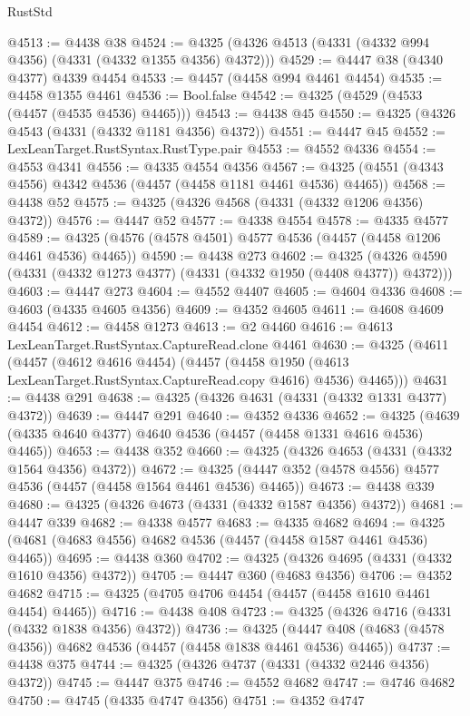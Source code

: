 \begin{lexlean}{RustStd}
\begin{coremodule}
{\begin{coremodule}
{{{{{{{{{{{{{{{{{{{{{{{{{{{{{{{{{{{{{{{{{{{{{{{{{{{{{{{{{{{{{{{{{{{{{{{{{{{{{{{{@4513 := @4438 @38
@4524 := @4325 (@4326 @4513 (@4331 (@4332 @994 @4356) (@4331 (@4332 @1355 @4356) @4372)))
@4529 := @4447 @38 (@4340 @4377) @4339 @4454
@4533 := @4457 (@4458 @994 @4461 @4454)
@4535 := @4458 @1355 @4461
@4536 := Bool.false
@4542 := @4325 (@4529 (@4533 (@4457 (@4535 @4536) @4465)))
@4543 := @4438 @45
@4550 := @4325 (@4326 @4543 (@4331 (@4332 @1181 @4356) @4372))
@4551 := @4447 @45
@4552 := LexLeanTarget.RustSyntax.RustType.pair
@4553 := @4552 @4336
@4554 := @4553 @4341
@4556 := @4335 @4554 @4356
@4567 := @4325 (@4551 (@4343 @4556) @4342 @4536 (@4457 (@4458 @1181 @4461 @4536) @4465))
@4568 := @4438 @52
@4575 := @4325 (@4326 @4568 (@4331 (@4332 @1206 @4356) @4372))
@4576 := @4447 @52
@4577 := @4338 @4554
@4578 := @4335 @4577
@4589 := @4325 (@4576 (@4578 @4501) @4577 @4536 (@4457 (@4458 @1206 @4461 @4536) @4465))
@4590 := @4438 @273
@4602 := @4325 (@4326 @4590 (@4331 (@4332 @1273 @4377) (@4331 (@4332 @1950 (@4408 @4377)) @4372)))
@4603 := @4447 @273
@4604 := @4552 @4407
@4605 := @4604 @4336
@4608 := @4603 (@4335 @4605 @4356)
@4609 := @4352 @4605
@4611 := @4608 @4609 @4454
@4612 := @4458 @1273
@4613 := @2 @4460
@4616 := @4613 LexLeanTarget.RustSyntax.CaptureRead.clone @4461
@4630 := @4325
    (@4611
      (@4457
        (@4612 @4616 @4454)
        (@4457 (@4458 @1950 (@4613 LexLeanTarget.RustSyntax.CaptureRead.copy @4616) @4536) @4465)))
@4631 := @4438 @291
@4638 := @4325 (@4326 @4631 (@4331 (@4332 @1331 @4377) @4372))
@4639 := @4447 @291
@4640 := @4352 @4336
@4652 := @4325 (@4639 (@4335 @4640 @4377) @4640 @4536 (@4457 (@4458 @1331 @4616 @4536) @4465))
@4653 := @4438 @352
@4660 := @4325 (@4326 @4653 (@4331 (@4332 @1564 @4356) @4372))
@4672 := @4325 (@4447 @352 (@4578 @4556) @4577 @4536 (@4457 (@4458 @1564 @4461 @4536) @4465))
@4673 := @4438 @339
@4680 := @4325 (@4326 @4673 (@4331 (@4332 @1587 @4356) @4372))
@4681 := @4447 @339
@4682 := @4338 @4577
@4683 := @4335 @4682
@4694 := @4325 (@4681 (@4683 @4556) @4682 @4536 (@4457 (@4458 @1587 @4461 @4536) @4465))
@4695 := @4438 @360
@4702 := @4325 (@4326 @4695 (@4331 (@4332 @1610 @4356) @4372))
@4705 := @4447 @360 (@4683 @4356)
@4706 := @4352 @4682
@4715 := @4325 (@4705 @4706 @4454 (@4457 (@4458 @1610 @4461 @4454) @4465))
@4716 := @4438 @408
@4723 := @4325 (@4326 @4716 (@4331 (@4332 @1838 @4356) @4372))
@4736 := @4325
    (@4447 @408 (@4683 (@4578 @4356)) @4682 @4536 (@4457 (@4458 @1838 @4461 @4536) @4465))
@4737 := @4438 @375
@4744 := @4325 (@4326 @4737 (@4331 (@4332 @2446 @4356) @4372))
@4745 := @4447 @375
@4746 := @4552 @4682
@4747 := @4746 @4682
@4750 := @4745 (@4335 @4747 @4356)
@4751 := @4352 @4747
}}}}}}}}}}}}}}}}}}}}}}}}}}}}}}}}}}}}}}}}}}}}}}}}}}}}}}}}}}}}}}}}}}}}}}}}}}}}}}}}
\end{coremodule}}
\end{coremodule}
\end{lexlean}
